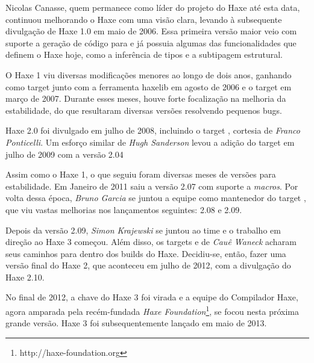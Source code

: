 Nicolas Canasse, quem permanece como líder do projeto do Haxe até esta data, continuou melhorando o Haxe com uma visão clara, levando à subsequente divulgação de Haxe 1.0 em maio de 2006. Essa primeira versão maior veio com suporte a geração de código para  e já possuia algumas das funcionalidades que definem o Haxe hoje, como a inferência de tipos e a subtipagem estrutural.

O Haxe 1 viu diversas modificações menores ao longo de dois anos, ganhando  como target junto com a ferramenta {haxelib} em agosto de 2006 e o target em março de 2007. Durante esses meses, houve forte focalização na melhoria da estabilidade, do que resultaram diversas versões resolvendo pequenos bugs.

Haxe 2.0 foi divulgado em julho de 2008, incluindo o target , cortesia de \emph{Franco Ponticelli}. Um esforço similar de \emph{Hugh Sanderson} levou a adição do target  em julho de 2009 com a versão 2.04

Assim como o Haxe 1, o que seguiu foram diversas meses de versões para estabilidade. Em Janeiro de 2011 saiu a versão 2.07 com suporte a \emph{macros}. Por volta dessa época, \emph{Bruno Garcia} se juntou a equipe como mantenedor do target , que viu vastas melhorias nos lançamentos seguintes: 2.08 e 2.09.

Depois da versão 2.09, \emph{Simon Krajewski} se juntou ao time e o trabalho em direção ao Haxe 3 começou. Além disso, os targets  e  de \emph{Cauê Waneck} acharam seus caminhos para dentro dos builds do Haxe. Decidiu-se, então, fazer uma versão final do Haxe 2, que aconteceu em julho de 2012, com a divulgação do Haxe 2.10.

No final de 2012, a chave do Haxe 3 foi virada e a equipe do Compilador Haxe, agora amparada pela recém-fundada \emph{Haxe Foundation}\footnote{http://haxe-foundation.org}, se focou nesta próxima grande versão. Haxe 3 foi subsequentemente lançado em maio de 2013.


